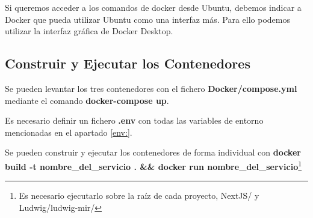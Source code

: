 Si queremos acceder a los comandos de docker desde Ubuntu, debemos
indicar a Docker que pueda utilizar Ubuntu como una interfaz más. Para
ello podemos utilizar la interfaz gráfica de Docker Desktop.

\subsection{Construir y Ejecutar los Contenedores}

Se pueden levantar los tres contenedores con el fichero \textbf{Docker/compose.yml} mediante el comando \textbf{docker-compose up}.

Es necesario definir un fichero \textbf{.env} con todas las variables de entorno mencionadas en el apartado \ref{env:}.

Se pueden construir y ejecutar los contenedores de forma individual con \textbf{docker build -t nombre\_del\_servicio . \&\& docker run nombre\_del\_servicio}\footnote{Es necesario ejecutarlo sobre la raíz de cada proyecto, NextJS/ y Ludwig/ludwig-mir/}
